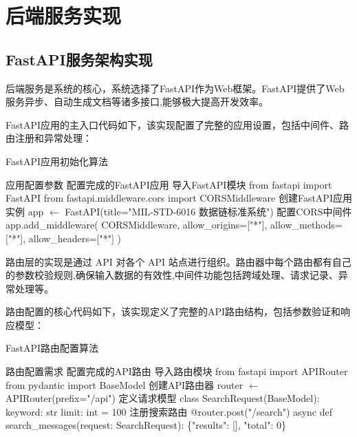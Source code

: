 \section{后端服务实现}

\subsection{FastAPI服务架构实现}

后端服务是系统的核心，系统选择了FastAPI作为Web框架。FastAPI提供了Web服务异步、自动生成文档等诸多接口,能够极大提高开发效率。

FastAPI应用的主入口代码如下，该实现配置了完整的应用设置，包括中间件、路由注册和异常处理：

\begin{algorithm}[H]
\caption{FastAPI应用初始化算法}
\begin{algorithmic}[1]
\REQUIRE 应用配置参数
\ENSURE 配置完成的FastAPI应用
\STATE 导入FastAPI模块
\STATE from fastapi import FastAPI
\STATE from fastapi.middleware.cors import CORSMiddleware
\STATE 创建FastAPI应用实例
\STATE app $\leftarrow$ FastAPI(title="MIL-STD-6016 数据链标准系统")
\STATE 配置CORS中间件
\STATE app.add\_middleware(
\STATE     CORSMiddleware,
\STATE     allow\_origins=["*"],
\STATE     allow\_methods=["*"],
\STATE     allow\_headers=["*"]
\STATE )
\end{algorithmic}
\end{algorithm}

路由层的实现是通过 API 对各个 API 站点进行组织。路由器中每个路由都有自己的参数校验规则,确保输入数据的有效性,中间件功能包括跨域处理、请求记录、异常处理等。

路由配置的核心代码如下，该实现定义了完整的API路由结构，包括参数验证和响应模型：

\begin{algorithm}[H]
\caption{FastAPI路由配置算法}
\begin{algorithmic}[1]
\REQUIRE 路由配置需求
\ENSURE 配置完成的API路由
\STATE 导入路由模块
\STATE from fastapi import APIRouter
\STATE from pydantic import BaseModel
\STATE 创建API路由器
\STATE router $\leftarrow$ APIRouter(prefix="/api")
\STATE 定义请求模型
\STATE class SearchRequest(BaseModel):
\STATE     keyword: str
\STATE     limit: int = 100
\STATE 注册搜索路由
\STATE @router.post("/search")
\STATE async def search\_messages(request: SearchRequest):
\STATE     \RETURN \{"results": [], "total": 0\}
\end{algorithmic}
\end{algorithm}

